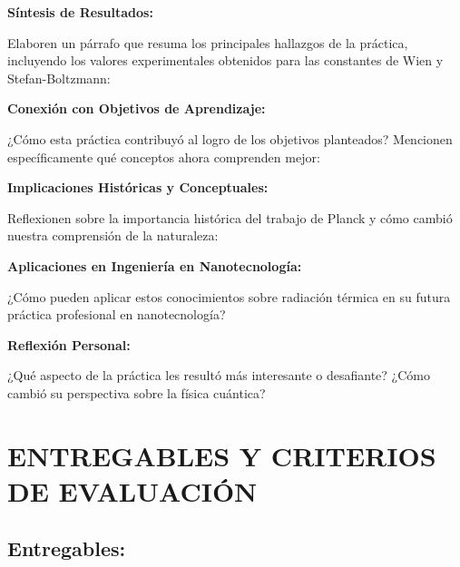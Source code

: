 \documentclass[12pt,a4paper]{article}
\begin{document}
	\begin{conclusionbox}
		\textbf{Síntesis de Resultados:}
		
		Elaboren un párrafo que resuma los principales hallazgos de la práctica, incluyendo los valores experimentales obtenidos para las constantes de Wien y Stefan-Boltzmann:
		
		\vspace{3cm}
		
		\textbf{Conexión con Objetivos de Aprendizaje:}
		
		¿Cómo esta práctica contribuyó al logro de los objetivos planteados? Mencionen específicamente qué conceptos ahora comprenden mejor:
		
		\vspace{3cm}
		
		\textbf{Implicaciones Históricas y Conceptuales:}
		
		Reflexionen sobre la importancia histórica del trabajo de Planck y cómo cambió nuestra comprensión de la naturaleza:
		
		\vspace{3cm}
		
		\textbf{Aplicaciones en Ingeniería en Nanotecnología:}
		
		¿Cómo pueden aplicar estos conocimientos sobre radiación térmica en su futura práctica profesional en nanotecnología?
		
		\vspace{3cm}
		
		\textbf{Reflexión Personal:}
		
		¿Qué aspecto de la práctica les resultó más interesante o desafiante? ¿Cómo cambió su perspectiva sobre la física cuántica?
		
		\vspace{3cm}
	\end{conclusionbox}
	
	
	\section{ENTREGABLES Y CRITERIOS DE EVALUACIÓN}
	
	\subsection{Entregables:}
	
\end{document}
